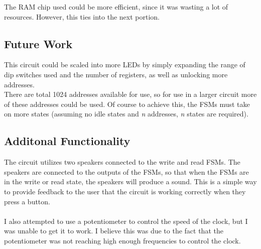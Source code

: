 \documentclass{article}
\begin{document}
        The RAM chip used could be more efficient, since it was wasting a lot of resources. However, this ties into the next portion. 

        \subsection{Future Work}

        This circuit could be scaled into more LEDs by simply expanding the range of dip switches used and the number of registers, as well as unlocking more addresses. \\
        There are total 1024 addresses available for use, so for use in a larger circuit more of these addresses could be used. Of course to achieve this, the FSMs must take on more states (assuming no idle states and \textit{n} addresses, \textit{n} states are required).\\


        \subsection{Additonal Functionality}

        The circuit utilizes two speakers connected to the write and read FSMs. The speakers are connected to the outputs of the FSMs, so that when the FSMs are in the write or read state, the speakers will produce a sound. This is a simple way to provide feedback to the user that the circuit is working correctly when they press a button.\\\\
        I also attempted to use a potentiometer to control the speed of the clock, but I was unable to get it to work. I believe this was due to the fact that the potentiometer was not reaching high enough frequencies to control the clock.\\
\end{document}
